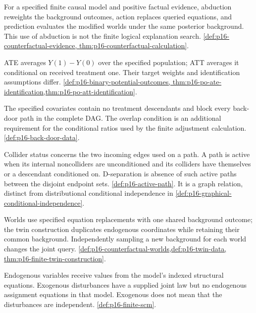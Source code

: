 \begin{description}[style=nextline,leftmargin=0pt]
\item[Abduction, action, prediction.]
For a specified finite causal model and positive factual evidence,
abduction reweights the background outcomes, action replaces queried
equations, and prediction evaluates the modified worlds under the same
posterior background. This use of abduction is not the finite logical
explanation search. \cref{def:p16-counterfactual-evidence,
thm:p16-counterfactual-calculation}.
\item[Average treatment effect; effect among the treated.]
ATE averages \(Y(1)-Y(0)\) over the specified population; ATT averages it
conditional on received treatment one. Their target weights and
identification assumptions differ.
\cref{def:p16-binary-potential-outcomes,
thm:p16-po-ate-identification,thm:p16-po-att-identification}.
\item[Back-door criterion; adjustment.]
The specified covariates contain no treatment descendants and block
every back-door path in the complete DAG. The overlap condition is an
additional requirement for the conditional ratios used by the finite
adjustment calculation. \cref{def:p16-back-door-data}.
\item[Collider; d-separation.]
Collider status concerns the two incoming edges used on a path. A path
is active when its internal noncolliders are unconditioned and its
colliders have themselves or a descendant conditioned on. D-separation
is absence of such active paths between the disjoint endpoint sets.
\cref{def:p16-active-path}. It is a graph relation, distinct from
distributional conditional independence in
\cref{def:p16-graphical-conditional-independence}.
\item[Counterfactual world; twin construction.]
Worlds use specified equation replacements with one shared background
outcome; the twin construction duplicates endogenous coordinates while
retaining their common background. Independently sampling a new background
for each world changes the joint query.
\cref{def:p16-counterfactual-worlds,def:p16-twin-data,
thm:p16-finite-twin-construction}.
\item[Endogenous; exogenous.]
Endogenous variables receive values from the model's indexed structural
equations. Exogenous disturbances have a supplied joint law but no
endogenous assignment equations in that model. Exogenous does not mean
that the disturbances are independent.
\cref{def:p16-finite-scm}.
\item[Exchangeability; consistency; positivity.]

\end{description}
